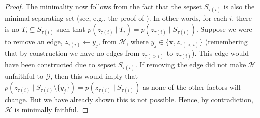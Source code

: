 \begin{proof}
The minimality now follows from the fact that the sepset $S_{\tau(i)}$ is also the minimal separating set (see, e.g., the proof of \citep[Theorem 4.12]{KollerFriedman2009}).  In other words, for each $i$, there is no $T_i\subsetneq S_{\tau(i)}$ such
that $p(z_{\tau(i)}\mid T_i) = p(z_{\tau(i)}\mid S_{\tau(i)})$. 
Suppose we were to remove an edge, $z_{\tau(i)}\leftarrow y_j$, from $\mathcal{H}$, where
$y_j \in \{\mathbf{x},z_{\tau(<i)}\}$ (remembering that by construction we have no edges from $z_{\tau(>i)}$ to $z_{\tau(i)}$). This edge would have been constructed due to sepset $S_{\tau(i)}$.
If removing the edge did not make $\mathcal{H}$ unfaithful to $\mathcal{G}$, then this would imply that
$p(z_{\tau(i)}\mid S_{\tau(i)}\setminus\{y_j\}) = p(z_{\tau(i)}\mid S_{\tau(i)})$ as none of the other
factors will change.  But we have already shown this is not possible.
Hence, by contradiction, $\mathcal{H}$ is minimally faithful.
\end{proof}
